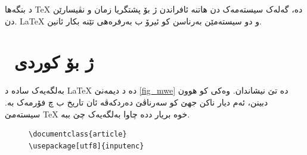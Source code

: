 \documentclass[14pt]{article}
\begin{document}
د بنگەھا 
\textenglish{\TeX} 
 دە، گەلەک سیستەمەک دن ھاتنە ئافراندن ژ بۆ پشتگریا زمان و نڤیسارێن دن. 
 \textenglish{\LaTeX} 
  و 
 \textenglish{\XeLaTeX} 
   دو سیستەمێن بەرناسن کو ئیرۆ ب بەرفرەھی تێنە بکار ئانین.


\section{\XeLaTeX~ژ بۆ کوردی}

بەلگەیەک سادە د 
 \textenglish{\LaTeX} 
 دە د دیمەنێ
 \ref{fig_mwe}  
 دە تێ نیشاندان. وەکی کو ھوون دبینن، ئەم دیار ناکن جھێ کو سەرناڤێ دەردکەڤە ئان تاریخ ب چ فۆرمەک بە. سیستەمێ 
 \textenglish{\TeX} 
  خوە بریار ددە چاوا بەلگەیەک چێ ببە.

\begin{figure}[h]
    \centering
    \begin{minipage}{0.29\textwidth}
    \end{minipage}\hfill
    \begin{minipage}{0.65\textwidth}
\begin{english}
\begin{lstlisting}
\documentclass{article}
\usepackage[utf8]{inputenc}


\end{lstlisting}
\end{english}
\end{minipage}
\end{figure}
\end{document}
